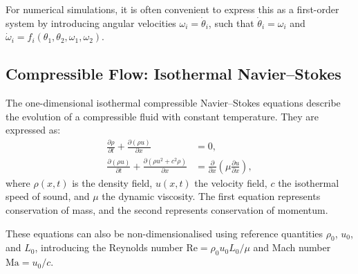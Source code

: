 For numerical simulations, it is often convenient to express this as a first-order system by introducing angular velocities $\omega_i = \dot{\theta}_i$, such that $\dot{\theta}_i = \omega_i$ and $\dot{\omega}_i = f_i(\theta_1, \theta_2, \omega_1, \omega_2)$.

\subsection{Compressible Flow: Isothermal Navier–Stokes}

The one-dimensional isothermal compressible Navier–Stokes equations describe the evolution of a compressible fluid with constant temperature. They are expressed as:
\begin{equation}
\begin{aligned}
\frac{\partial \rho}{\partial t} + \frac{\partial (\rho u)}{\partial x} &= 0, \\
\frac{\partial (\rho u)}{\partial t} + \frac{\partial (\rho u^2 + c^2 \rho)}{\partial x} &= 
\frac{\partial}{\partial x} \left( \mu \frac{\partial u}{\partial x} \right),
\end{aligned}
\label{eq:isothermal_ns}
\end{equation}
where $\rho(x,t)$ is the density field, $u(x,t)$ the velocity field, $c$ the isothermal speed of sound, and $\mu$ the dynamic viscosity. The first equation represents conservation of mass, and the second represents conservation of momentum.

These equations can also be non-dimensionalised using reference quantities $\rho_0$, $u_0$, and $L_0$, introducing the Reynolds number $\mathrm{Re} = \rho_0 u_0 L_0 / \mu$ and Mach number $\mathrm{Ma} = u_0 / c$.
